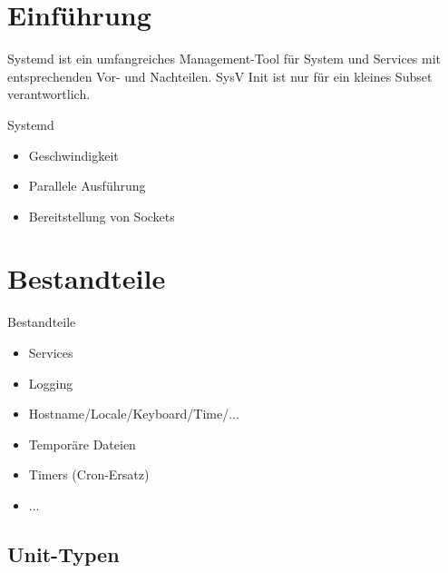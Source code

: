 
\maketitle

\begin{frame}
  \titlepage
\end{frame}

\cleardoublepage

\tableofcontents

\cleardoublepage

\section{Einführung}

Systemd ist ein umfangreiches Management-Tool für System und Services mit
entsprechenden Vor- und Nachteilen. SysV Init ist nur für ein kleines Subset verantwortlich.

\begin{frame}{Systemd}
  \begin{itemize}
    \item Geschwindigkeit
    \item Parallele Ausführung
    \item Bereitstellung von Sockets
  \end{itemize}
\end{frame}

\section{Bestandteile}

\begin{frame}{Bestandteile}
  \begin{itemize}
\item Services
\item Logging
\item Hostname/Locale/Keyboard/Time/...
\item Temporäre Dateien
\item Timers (Cron-Ersatz)
\item ...
\end{itemize}
\end{frame}

\subsection{Unit-Typen}

